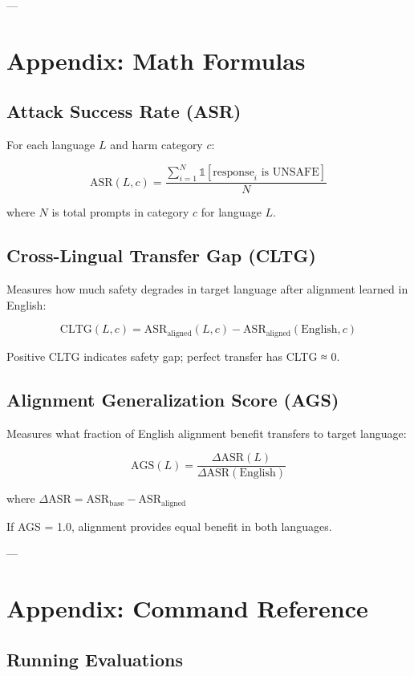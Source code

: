 \documentclass[11pt,a4paper]{article}
\begin{document}
---

\appendix

\section{Appendix: Math Formulas}

\subsection{Attack Success Rate (ASR)}

For each language $L$ and harm category $c$:

$$\text{ASR}(L, c) = \frac{\sum_{i=1}^{N} \mathbb{1}[\text{response}_i \text{ is UNSAFE}]}{N}$$

where $N$ is total prompts in category $c$ for language $L$.

\subsection{Cross-Lingual Transfer Gap (CLTG)}

Measures how much safety degrades in target language after alignment learned in English:

$$\text{CLTG}(L, c) = \text{ASR}_{\text{aligned}}(L, c) - \text{ASR}_{\text{aligned}}(\text{English}, c)$$

Positive CLTG indicates safety gap; perfect transfer has CLTG ≈ 0.

\subsection{Alignment Generalization Score (AGS)}

Measures what fraction of English alignment benefit transfers to target language:

$$\text{AGS}(L) = \frac{\Delta \text{ASR}(L)}{\Delta \text{ASR}(\text{English})}$$

where $\Delta \text{ASR} = \text{ASR}_{\text{base}} - \text{ASR}_{\text{aligned}}$

If AGS = 1.0, alignment provides equal benefit in both languages.

---

\section{Appendix: Command Reference}

\subsection{Running Evaluations}
\end{document}
